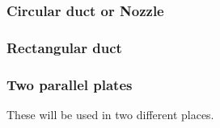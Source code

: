 \subsubsection*{Circular duct or Nozzle}



\subsubsection*{Rectangular duct}



\subsubsection*{Two parallel plates}

	These will be used in two different places.



